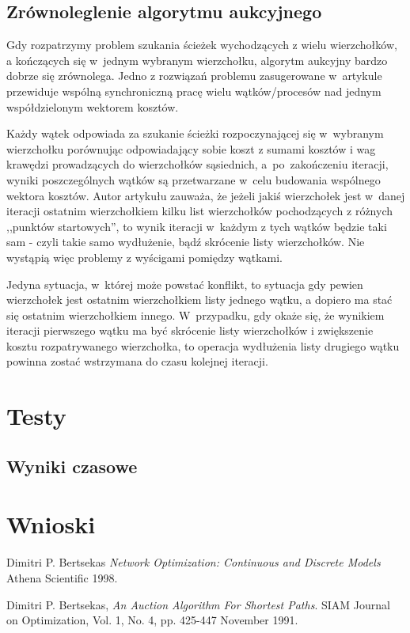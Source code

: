 \documentclass {article}
\begin{document}
\subsection{Zrównoleglenie algorytmu aukcyjnego}

Gdy rozpatrzymy problem szukania ścieżek wychodzących z wielu wierzchołków, a kończących się w~jednym wybranym wierzchołku, algorytm aukcyjny bardzo dobrze się zrównolega. Jedno z rozwiązań problemu zasugerowane w~artykule \cite{Bertsekas1991} przewiduje wspólną synchroniczną pracę wielu wątków/procesów nad jednym współdzielonym wektorem kosztów.

Każdy wątek odpowiada za szukanie ścieżki rozpoczynającej się w~wybranym wierzchołku porównując odpowiadający sobie koszt z sumami kosztów i wag krawędzi prowadzących do wierzchołków sąsiednich, a~po~zakończeniu iteracji, wyniki poszczególnych wątków są przetwarzane w~celu budowania wspólnego wektora kosztów. Autor artykułu zauważa, że jeżeli jakiś wierzchołek jest w~danej iteracji ostatnim wierzchołkiem kilku list wierzchołków pochodzących z różnych ,,punktów startowych'', to wynik iteracji w~każdym z tych wątków będzie taki sam - czyli takie samo wydłużenie, bądź skrócenie listy wierzchołków. Nie wystąpią więc problemy z wyścigami pomiędzy wątkami.

Jedyna sytuacja, w~której może powstać konflikt, to sytuacja gdy pewien wierzchołek jest ostatnim wierzchołkiem listy jednego wątku, a dopiero ma stać się ostatnim wierzchołkiem innego. W~przypadku, gdy okaże się, że wynikiem iteracji pierwszego wątku ma być skrócenie listy wierzchołków i zwiększenie kosztu rozpatrywanego wierzchołka, to operacja wydłużenia listy drugiego wątku powinna zostać wstrzymana do czasu kolejnej iteracji.

\section{Testy}

\subsection{Wyniki czasowe}

\section{Wnioski}


\begin{thebibliography}{9}

        Dimitri P. Bertsekas
        \emph{Network Optimization: Continuous and Discrete Models}
        Athena Scientific
        1998.

        Dimitri P. Bertsekas,
        \emph{An Auction Algorithm For Shortest Paths}.
        SIAM Journal on Optimization,
        Vol. 1, No. 4, pp. 425-447
        November 1991.
      
\end{thebibliography}
\end{document}
